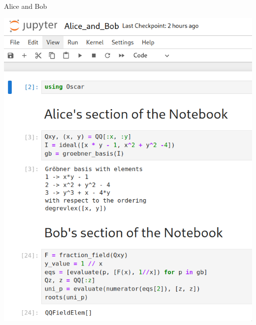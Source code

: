 \documentclass[9pt]{beamer}
\theoremstyle{definition}
\begin{document}

\begin{frame}[fragile]{Alice and Bob}
  \begin{center}
    \includegraphics[height=0.8\textheight]{images/notebook}
  \end{center}

\end{frame}

\end{document}
